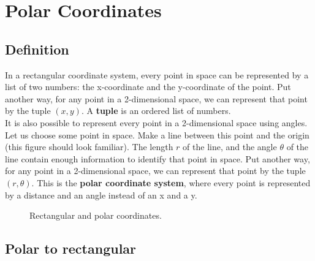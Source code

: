\section{Polar Coordinates}

\subsection{Definition}

In a rectangular coordinate system, every point in space can be represented by a list of two numbers: the x-coordinate and the y-coordinate of the point.  Put another way, for any point in a 2-dimensional space, we can represent that point by the tuple $(x,y)$.  A {\bf tuple} is an ordered list of numbers.\\

It is also possible to represent every point in a 2-dimensional space using angles.  Let us choose some point in space.  Make a line between this point and the origin (this figure should look familiar).  The length $r$ of the line, and the angle $\theta$ of the line contain enough information to identify that point in space.  Put another way, for any point in a 2-dimensional space, we can represent that point by the tuple $(r,\theta)$.  This is the {\bf polar coordinate system}, where every point is represented by a distance and an angle instead of an x and a y.\\

\begin{figure}[htb]
\center
\caption{Rectangular and polar coordinates.}
\label{fig:rectangular and polar coordinates}
\end{figure}

\subsection{Polar to rectangular}


